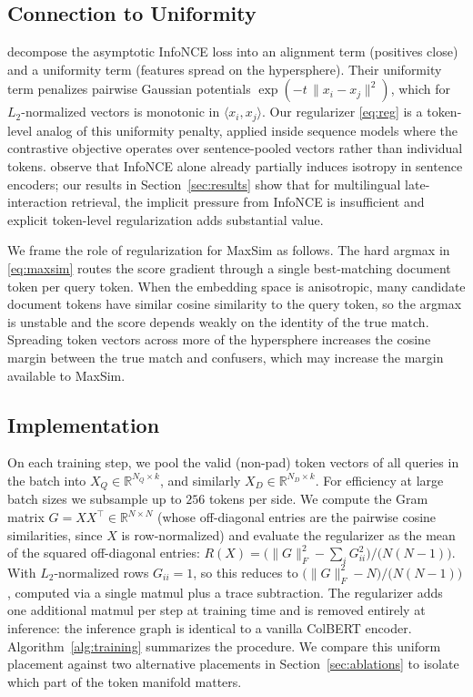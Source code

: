 \subsection{Connection to Uniformity}
\label{sec:method-uniformity}

\citet{wang2020understanding} decompose the asymptotic InfoNCE loss into an alignment term (positives close) and a uniformity term (features spread on the hypersphere). Their uniformity term penalizes pairwise Gaussian potentials $\exp(-t\,\|x_i - x_j\|^2)$, which for $L_2$-normalized vectors is monotonic in $\langle x_i, x_j \rangle$. Our regularizer \eqref{eq:reg} is a token-level analog of this uniformity penalty, applied inside sequence models where the contrastive objective operates over sentence-pooled vectors rather than individual tokens. \citet{xiao2023isotropy} observe that InfoNCE alone already partially induces isotropy in sentence encoders; our results in Section~\ref{sec:results} show that for multilingual late-interaction retrieval, the implicit pressure from InfoNCE is insufficient and explicit token-level regularization adds substantial value.

We frame the role of regularization for MaxSim as follows. The hard argmax in \eqref{eq:maxsim} routes the score gradient through a single best-matching document token per query token. When the embedding space is anisotropic, many candidate document tokens have similar cosine similarity to the query token, so the argmax is unstable and the score depends weakly on the identity of the true match. Spreading token vectors across more of the hypersphere increases the cosine margin between the true match and confusers, which may increase the margin available to MaxSim.

\subsection{Implementation}
\label{sec:method-impl}

On each training step, we pool the valid (non-pad) token vectors of all queries in the batch into $X_Q \in \mathbb{R}^{N_Q \times k}$, and similarly $X_D \in \mathbb{R}^{N_D \times k}$. For efficiency at large batch sizes we subsample up to $256$ tokens per side. We compute the Gram matrix $G = X X^\top \in \mathbb{R}^{N \times N}$ (whose off-diagonal entries are the pairwise cosine similarities, since $X$ is row-normalized) and evaluate the regularizer as the mean of the squared off-diagonal entries: $R(X) = \bigl(\|G\|_F^2 - \sum_i G_{ii}^2\bigr) \big/ \bigl(N(N-1)\bigr)$. With $L_2$-normalized rows $G_{ii}=1$, so this reduces to $\bigl(\|G\|_F^2 - N\bigr) \big/ \bigl(N(N-1)\bigr)$, computed via a single matmul plus a trace subtraction. The regularizer adds one additional matmul per step at training time and is removed entirely at inference: the inference graph is identical to a vanilla ColBERT encoder. Algorithm~\ref{alg:training} summarizes the procedure. We compare this uniform placement against two alternative placements in Section~\ref{sec:ablations} to isolate which part of the token manifold matters.


